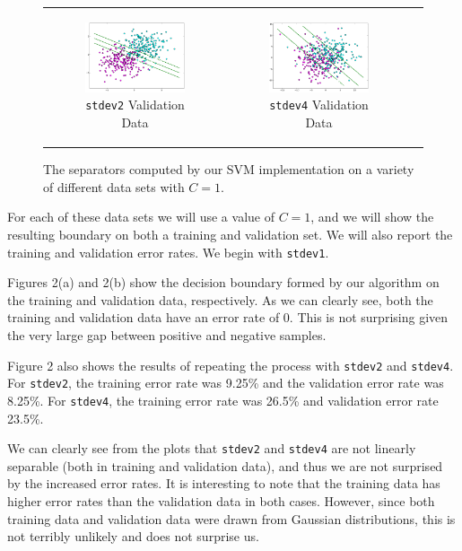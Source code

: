 \documentclass{sigchi}
\begin{document}
\begin{figure}[!ht]
\begin{tabular}{c c c}
\begin{subfigure}[b]{2.25in}
	\includegraphics[width=2.25in]{plots/1-2/stdev2valid.png}
	\caption{\texttt{stdev2} Validation Data}
\end{subfigure} &

\begin{subfigure}[b]{2.25in}
	\includegraphics[width=2.25in]{plots/1-2/stdev4valid.png}
	\caption{\texttt{stdev4} Validation Data}
\end{subfigure} \\
\end{tabular}
\caption{The separators computed by our SVM implementation on a variety of different data sets with $C = 1$.}
\end{figure}

For each of these data sets we will use a value of $C = 1$, and we will show the resulting boundary on both a training and validation set. We will also report the training and validation error rates. We begin with \texttt{stdev1}.

Figures 2(a) and 2(b) show the decision boundary formed by our algorithm on the training and validation data, respectively. As we can clearly see, both the training and validation data have an error rate of 0. This is not surprising given the very large gap between positive and negative samples.

Figure 2 also shows the results of repeating the process with \texttt{stdev2} and \texttt{stdev4}. For \texttt{stdev2}, the training error rate was 9.25\% and the validation error rate was 8.25\%. For \texttt{stdev4}, the training error rate was 26.5\% and validation error rate 23.5\%.

We can clearly see from the plots that \texttt{stdev2} and \texttt{stdev4} are not linearly separable (both in training and validation data), and thus we are not surprised by the increased error rates. It is interesting to note that the training data has higher error rates than the validation data in both cases. However, since both training data and validation data were drawn from Gaussian distributions, this is not terribly unlikely and does not surprise us.
\end{document}
